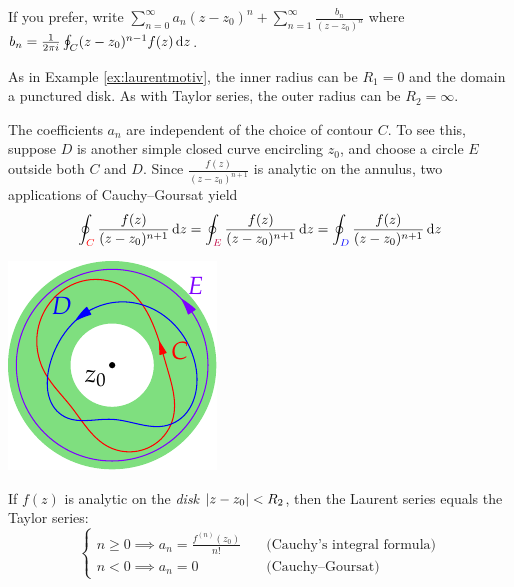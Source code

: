 \begin{itemize}
  \item If you prefer, write $\sum\limits_{n=0}^\infty a_n(z-z_0)^n+\sum\limits_{n=1}^\infty \frac{b_n}{(z-z_0)^n}$ where $b_n=\frac 1{2\pi i}\oint_C(z-z_0)^{n-1}f(z)\,{\mathrm{d} z}$.
  \item As in Example \ref{ex:laurentmotiv}, the inner radius can be $R_1=0$ and the domain a punctured disk. As with Taylor series, the outer radius can be $R_2=\infty$.\par
  \begin{minipage}[t]{0.73\linewidth}\vspace{0pt}
		\item The coefficients $a_n$ are independent of the choice of contour $C$.\smallbreak
		To see this, suppose $D$ is another simple closed curve encircling $z_0$, and choose a circle $E$ outside both $C$ and $D$. Since $\frac{f(z)}{(z-z_0)^{n+1}}$ is analytic on the annulus, two applications of Cauchy--Goursat yield
	  \[
	  	\oint_{\textcolor{red}{C}}\frac{f(z)}{(z-z_0)^{n+1}}\,{\mathrm{d} z}
	  	=\oint_{\textcolor{purple}{E}}\frac{f(z)}{(z-z_0)^{n+1}}\,{\mathrm{d} z}
	  	=\oint_{\textcolor{blue}{D}}\frac{f(z)}{(z-z_0)^{n+1}}\,{\mathrm{d} z}
	  \]
	\end{minipage}
	\hfill
	\begin{minipage}[t]{0.26\linewidth}\vspace{-5pt}
		\flushright\includegraphics[scale=0.95]{laurent3}
	\end{minipage}\par
  
  \item If $f(z)$ is analytic on the \emph{disk} $\left| z-z_0\right|<R_2$, then the Laurent series equals the Taylor series:
	\[
		\begin{cases}
			n\ge 0\implies a_n=\frac{f^{(n)}(z_0)}{n!} \quad &\text{(Cauchy's integral formula)}\\
			n<0\implies a_n=0 \quad &\text{(Cauchy--Goursat)}
		\end{cases}
	\]
\end{itemize}

